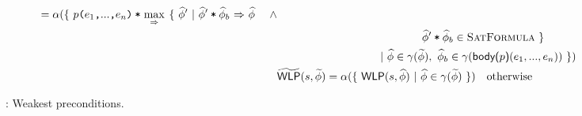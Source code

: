 \documentclass {llncs}
\begin{document}
\begin{figure}[h!]
\begin{small}
\begin{align*}
            = \alpha(\{~ \phiCons{\ttt{$p$($e_1$,$...$,$e_n$)}}{} \maximp~ \{~ \sphi' ~|~ \phiImplies{\phiCons{\sphi'}{\sphi_b}}{\sphi} ~~~~\wedge \\
            &\hspace*{131pt} \phiCons{\sphi'}{\sphi_b} \in \setFormulaA ~\}\\
            &\hspace*{90pt} ~|~ \sphi \in \gamma(\gphi),~ \sphi_b \in \gamma(\body{p}(e_1,...,e_n)) ~\}) \\
%
            &\gWP(s,\gphi)
            = \alpha(\{~ \WP(s,\sphi) ~|~ \sphi \in \gamma(\gphi) ~\}) \quad \text{otherwise}
        \end{align*}
    \end{small}
    \caption{\gvlidf: Weakest preconditions.}
    \label{fig:gvlrp-wlp}
\end{figure}
\clearpage
\end{document}

